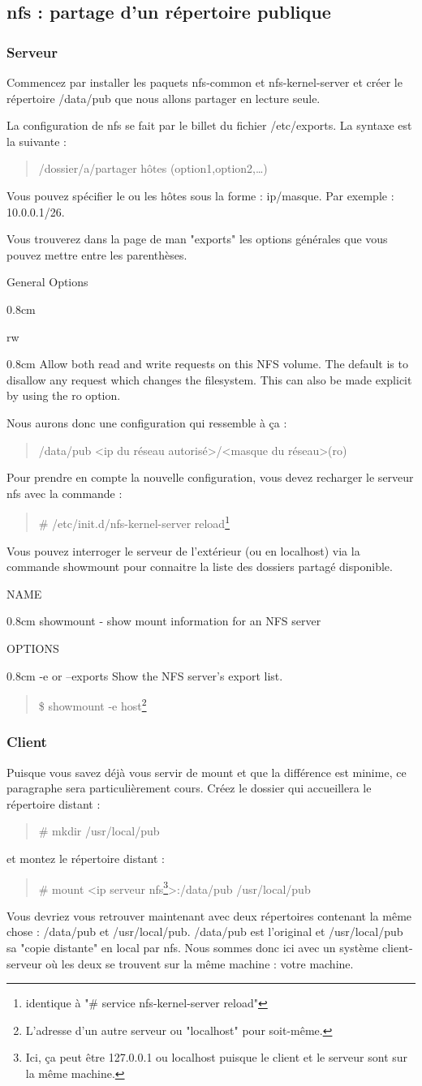 \documentclass[a4paper,11pt]{article}
\newcommand{\commande}[1] {
    \begin{quote}
    \tt\raggedright #1 
    \end{quote}
}
\newcommand{\man}[2]{
    \begin{tcolorbox}[toprule=3mm,width=\textwidth,outer arc=0mm,colbacktitle=grayman,coltitle=black,colback={grayman},colframe={grayman},title={man : \tt #1}]
        \tt\raggedright #2
    \end{tcolorbox}
}
\newcommand{\mandesc}[1]{
    \begin{adjustwidth}{0.8cm}{}
        #1
    \end{adjustwidth}
}
\begin{document}
\subsection{nfs : partage d'un répertoire publique}
\subsubsection{Serveur}
\par Commencez par installer les paquets nfs-common et nfs-kernel-server et créer le répertoire /data/pub que nous allons partager en lecture seule.
\par La configuration de nfs se fait par le billet du fichier /etc/exports. La syntaxe est la suivante :
\commande{/dossier/a/partager hôtes (option1,option2,\dots)}
\par Vous pouvez spécifier le ou les hôtes sous la forme : ip/masque. Par exemple : 10.0.0.1/26.
\par Vous trouverez dans la page de man "exports" les options générales que vous pouvez mettre entre les parenthèses.
\man{exports}{
General Options
\mandesc{
rw
\mandesc{Allow both read and write requests on this NFS volume. The default is to disallow any request which changes the filesystem.  This can also be made explicit by using the ro option.}
}}
\par Nous aurons donc une configuration qui ressemble à ça :
\commande{/data/pub <ip du réseau autorisé>/<masque du réseau>(ro)}
\par Pour prendre en compte la nouvelle configuration, vous devez recharger le serveur nfs avec la commande :
\commande{\# /etc/init.d/nfs-kernel-server reload\footnote{identique à "\# service nfs-kernel-server reload"}}
\par Vous pouvez interroger le serveur de l'extérieur (ou en localhost) via la commande showmount pour connaitre la liste des dossiers partagé disponible.
\man{showmount}{NAME
\mandesc{showmount - show mount information for an NFS server}
OPTIONS
\mandesc{-e or --exports Show the NFS server's export list.}}
\commande{\$ showmount -e host\footnote{L'adresse d'un autre serveur ou "localhost" pour soit-même.}}

\subsubsection{Client}
\par Puisque vous savez déjà vous servir de mount et que la différence est minime, ce paragraphe sera particulièrement cours. Créez le dossier qui accueillera le répertoire distant :
\commande{\# mkdir /usr/local/pub}
et montez le répertoire distant :
\commande{\# mount <ip serveur nfs\footnote{Ici, ça peut être 127.0.0.1 ou localhost puisque le client et le serveur sont sur la même machine.}>:/data/pub /usr/local/pub}
\par Vous devriez vous retrouver maintenant avec deux répertoires contenant la même chose : /data/pub et /usr/local/pub. /data/pub est l'original et /usr/local/pub sa "copie distante" en local par nfs. Nous sommes donc ici avec un système client-serveur où les deux se trouvent sur la même machine : votre machine.
\end{document}
